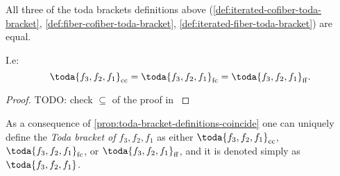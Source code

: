 \begin{proposition}
    \label{prop:toda-bracket-definitions-coincide}
    All three of the toda brackets definitions above (\autoref{def:iterated-cofiber-toda-bracket}, \autoref{def:fiber-cofiber-toda-bracket}, \autoref{def:iterated-fiber-toda-bracket}) are equal.

    I.e:
    \[
        \toda{f_3, f_2, f_1}_{\cc} = \toda{f_3, f_2, f_1}_{\fc} = \toda{f_3, f_2, f_1}_{\ff}.
    \]
\end{proposition}
\begin{proof}
    TODO: check  \( \subseteq \) of the proof in \cite[Proposition 3.3]{Christensen-Frankland_2017}
\end{proof}

\begin{definition}
    As a consequence of \autoref{prop:toda-bracket-definitions-coincide} one can uniquely define the \emph{Toda bracket of \( f_3, f_2, f_1 \)} as either \( \toda{f_3, f_2, f_1}_{\cc} \), \( \toda{f_3, f_2, f_1}_{\fc} \), or \( \toda{f_3, f_2, f_1}_{\ff} \), and it is denoted simply as \emph{\( \toda{f_3, f_2, f_1} \)}.
\end{definition}

